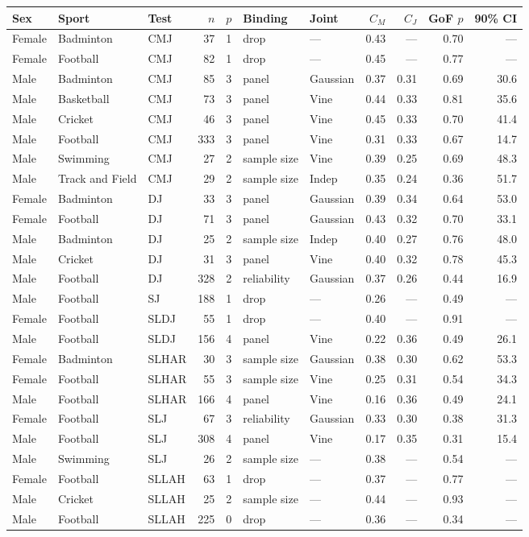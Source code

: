 \begin{tabular}{lllrrllrrrr}
\toprule
Sex & Sport & Test & $n$ & $p$ & Binding & Joint & $C_M$ & $C_J$ & GoF $p$ & 90\% CI \\
\midrule
Female & Badminton & CMJ & 37 & 1 & drop & — & 0.43 & --- & 0.70 & --- \\
Female & Football & CMJ & 82 & 1 & drop & — & 0.45 & --- & 0.77 & --- \\
Male & Badminton & CMJ & 85 & 3 & panel & Gaussian & 0.37 & 0.31 & 0.69 & 30.6 \\
Male & Basketball & CMJ & 73 & 3 & panel & Vine & 0.44 & 0.33 & 0.81 & 35.6 \\
Male & Cricket & CMJ & 46 & 3 & panel & Vine & 0.45 & 0.33 & 0.70 & 41.4 \\
Male & Football & CMJ & 333 & 3 & panel & Vine & 0.31 & 0.33 & 0.67 & 14.7 \\
Male & Swimming & CMJ & 27 & 2 & sample size & Vine & 0.39 & 0.25 & 0.69 & 48.3 \\
Male & Track and Field & CMJ & 29 & 2 & sample size & Indep & 0.35 & 0.24 & 0.36 & 51.7 \\
Female & Badminton & DJ & 33 & 3 & panel & Gaussian & 0.39 & 0.34 & 0.64 & 53.0 \\
Female & Football & DJ & 71 & 3 & panel & Gaussian & 0.43 & 0.32 & 0.70 & 33.1 \\
Male & Badminton & DJ & 25 & 2 & sample size & Indep & 0.40 & 0.27 & 0.76 & 48.0 \\
Male & Cricket & DJ & 31 & 3 & panel & Vine & 0.40 & 0.32 & 0.78 & 45.3 \\
Male & Football & DJ & 328 & 2 & reliability & Gaussian & 0.37 & 0.26 & 0.44 & 16.9 \\
Male & Football & SJ & 188 & 1 & drop & — & 0.26 & --- & 0.49 & --- \\
Female & Football & SLDJ & 55 & 1 & drop & — & 0.40 & --- & 0.91 & --- \\
Male & Football & SLDJ & 156 & 4 & panel & Vine & 0.22 & 0.36 & 0.49 & 26.1 \\
Female & Badminton & SLHAR & 30 & 3 & sample size & Gaussian & 0.38 & 0.30 & 0.62 & 53.3 \\
Female & Football & SLHAR & 55 & 3 & sample size & Vine & 0.25 & 0.31 & 0.54 & 34.3 \\
Male & Football & SLHAR & 166 & 4 & panel & Vine & 0.16 & 0.36 & 0.49 & 24.1 \\
Female & Football & SLJ & 67 & 3 & reliability & Gaussian & 0.33 & 0.30 & 0.38 & 31.3 \\
Male & Football & SLJ & 308 & 4 & panel & Vine & 0.17 & 0.35 & 0.31 & 15.4 \\
Male & Swimming & SLJ & 26 & 2 & sample size & — & 0.38 & --- & 0.54 & --- \\
Female & Football & SLLAH & 63 & 1 & drop & — & 0.37 & --- & 0.77 & --- \\
Male & Cricket & SLLAH & 25 & 2 & sample size & — & 0.44 & --- & 0.93 & --- \\
Male & Football & SLLAH & 225 & 0 & drop & — & 0.36 & --- & 0.34 & --- \\
\bottomrule
\end{tabular}
